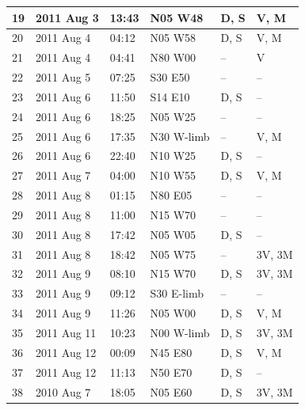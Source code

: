 \begin{singlespace}
\begin{table}[H]
\begin{center}
\begin{tabular}{|l|l|l|l|p{2.0cm}|p{2.0cm}|}
	19 & 2011 Aug 3 & 13:43 & N05 W48 & D, S & V, M \\ \hline
	20 & 2011 Aug 4 & 04:12 & N05 W58 & D, S & V, M \\ \hline
	21 & 2011 Aug 4 & 04:41 & N80 W00 & -- & V \\ \hline
	22 & 2011 Aug 5 & 07:25 & S30 E50 & -- & -- \\ \hline
	23 & 2011 Aug 6 & 11:50 & S14 E10 & D, S & -- \\ \hline
	24 & 2011 Aug 6 & 18:25 & N05 W25 & -- & -- \\ \hline
	25 & 2011 Aug 6 & 17:35 & N30 W-limb & -- & V, M \\ \hline
	26 & 2011 Aug 6 & 22:40 & N10 W25 & D, S & -- \\ \hline
	27 & 2011 Aug 7 & 04:00 & N10 W55 & D, S & V, M \\ \hline
	28 & 2011 Aug 8 & 01:15 & N80 E05 & -- & -- \\ \hline
	29 & 2011 Aug 8 & 11:00 & N15 W70 & -- & -- \\ \hline
	30 & 2011 Aug 8 & 17:42 & N05 W05 & D, S & -- \\ \hline
	31 & 2011 Aug 8 & 18:42 & N05 W75 & -- & 3V, 3M \\ \hline
	32 & 2011 Aug 9 & 08:10 & N15 W70 & D, S & 3V, 3M \\ \hline
	33 & 2011 Aug 9 & 09:12 & S30 E-limb & -- & -- \\ \hline
	34 & 2011 Aug 9 & 11:26 & N05 W00 & D, S & V, M \\ \hline
	35 & 2011 Aug 11 & 10:23 & N00 W-limb & D, S & 3V, 3M \\ \hline
	36 & 2011 Aug 12 & 00:09 & N45 E80 & D, S & V, M \\ \hline
	37 & 2011 Aug 12 & 11:13 & N50 E70 & D, S & -- \\ \hline
	38 & 2010 Aug 7 & 18:05 & N05 E60 & D, S & 3V, 3M \\ \hline
	\end{tabular}
    \\ \rule{0mm}{5mm}
    \end{center}
    \label{tab:eventlist}
\end{table}
\end{singlespace}

